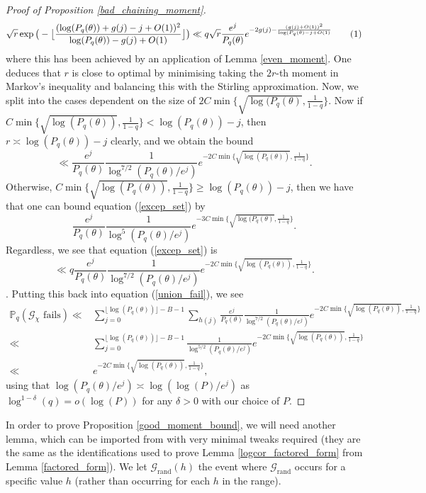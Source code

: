 \documentclass[reqno]{amsart}
\theoremstyle{definition}
\theoremstyle{remark}
\numberwithin{equation}{section}
\newcommand\numberthis{\addtocounter{equation}{1}\tag{\theequation}}
\theoremstyle{remark}
\begin{document}
\begin{proof}[Proof of Proposition \ref{bad_chaining_moment}]
    \begin{align*}
        \sqrt{r}\exp\big(-\big\lfloor\frac{(\log(P_q(\theta))+g(j)-j+O(1))^2}{\log(P_q(\theta))-g(j)+O(1)}\big\rfloor\big) \ll q\sqrt{r}\frac{e^j}{P_q(\theta)}e^{-2g(j)-\frac{(g(j)+O(1))^2}{\log(P_q(\theta)-j+O(1)}} \numberthis \label{excep_set}
    \end{align*}
    where this has been achieved by an application of Lemma \ref{even_moment}. One deduces that $r$ is close to optimal by minimising taking the $2r$-th moment in Markov's inequality and balancing this with the Stirling approximation. Now, we split into the cases dependent on the size of $2C\min\{\sqrt{\log(P_q(\theta)},\frac{1}{1-q}\}$. Now if $C\min\{\sqrt{\log(P_q(\theta))},\frac{1}{1-q}\} < \log(P_q(\theta))-j$, then $r \asymp \log(P_q(\theta))-j$ clearly, and we obtain the bound $$\ll \frac{e^j}{P_q(\theta)}\frac{1}{\log^{7/2}(P_q(\theta)/e^j)}e^{-2C\min\{\sqrt{\log(P_q(\theta))},\frac{1}{1-q}\}}.$$ Otherwise, $C\min\{\sqrt{\log(P_q(\theta))},\frac{1}{1-q}\} \geq \log(P_q(\theta))-j$, then we have that one can bound equation (\ref{excep_set}) by $$\frac{e^j}{P_q(\theta)}\frac{1}{\log^{5}(P_q(\theta)/e^j)}e^{-3C\min\{\sqrt{\log(P_q(\theta)},\frac{1}{1-q}\}}.$$
    Regardless, we see that equation (\ref{excep_set}) is $$\ll q\frac{e^j}{P_q(\theta)}\frac{1}{\log^{7/2}(P_q(\theta)/e^j)}e^{-2C\min\{\sqrt{\log(P_q(\theta))},\frac{1}{1-q}\}}.$$. Putting this back into equation (\ref{union_fail}), we see
    \begin{align*}
        \mathbb{P}_q(\mathcal{G}_\chi \text{ fails}) \ll& \sum_{j=0}^{\lfloor\log(P_q(\theta))\rfloor -B-1}\sum_{h(j)}\frac{e^j}{P_q(\theta)}\frac{1}{\log^{7/2}(P_q(\theta)/e^j)}e^{-2C\min\{\sqrt{\log(P_q(\theta))},\frac{1}{1-q}\}} \\
        \ll& \sum_{j=0}^{\lfloor\log(P_q(\theta))\rfloor -B-1}\frac{1}{\log^{5/2}(P_q(\theta)/e^j)}e^{-2C\min\{\sqrt{\log(P_q(\theta))},\frac{1}{1-q}\}} \\
        \ll& e^{-2C\min\{\sqrt{\log(P_q(\theta))},\frac{1}{1-q}\}},
    \end{align*}
    using that $\log(P_q(\theta)/e^j) \asymp \log(\log(P)/e^j)$ as $\log^{1-\delta}(q) = o(\log(P))$ for any $\delta > 0$ with our choice of $P$.
\end{proof}
In order to prove Proposition \ref{good_moment_bound}, we will need another lemma, which can be imported from \cite{harper2019partition} with very minimal tweaks required (they are the same as the identifications used to prove Lemma \ref{logcor_factored_form} from Lemma \ref{factored_form}). We let $\mathcal{G}_{\text{rand}}(h)$ the event where $\mathcal{G}_{\text{rand}}$ occurs for a specific value $h$ (rather than occurring for each $h$ in the range).
\end{document}
